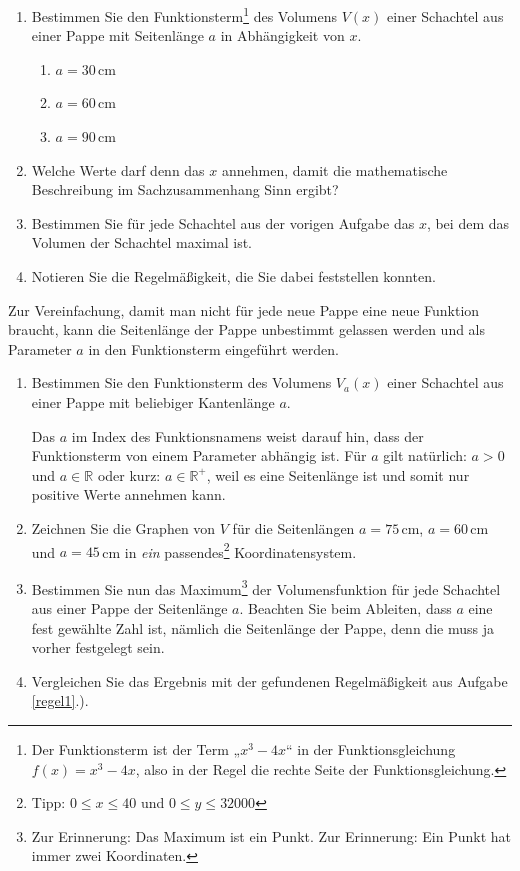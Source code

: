 \documentclass[11pt,a4paper,twoside,fleqn]{article}
\begin{document}
\begin{question}%
  \begin{enumerate}
  \item Bestimmen Sie den Funktionsterm\footnote{Der Funktionsterm ist
    der Term „$x^3-4x$“ in der Funktionsgleichung $f(x)=x^3-4x$, also
    in der Regel die rechte Seite der Funktionsgleichung.} des Volumens $V(x)$ einer Schachtel aus
    einer Pappe mit Seitenlänge $a$ in Abhängigkeit von $x$.
    \begin{multicols}{3}
      \begin{enumerate}
      \item $a=30\,$cm
      \item $a=60\,$cm
      \item $a=90\,$cm
      \end{enumerate}
    \end{multicols}
  \item Welche Werte darf denn das $x$ annehmen, damit die
    mathematische Beschreibung im Sachzusammenhang Sinn ergibt?
  \item Bestimmen Sie für jede Schachtel aus der vorigen Aufgabe das
    $x$, bei dem das Volumen der Schachtel maximal ist.
  \item \label{regel1}Notieren Sie die Regelmäßigkeit, die Sie dabei feststellen konnten.
  \end{enumerate}

  Zur Vereinfachung, damit man nicht für jede neue Pappe eine neue
  Funktion braucht, kann die Seitenlänge der Pappe unbestimmt gelassen 
  werden und als Parameter $a$ in den Funktionsterm eingeführt werden.
  \begin{enumerate}[resume]
  \item Bestimmen Sie den Funktionsterm des Volumens $V_a(x)$ einer
    Schachtel aus einer Pappe mit beliebiger Kantenlänge $a$.

    Das $a$
    im Index des Funktionsnamens weist darauf hin, dass der
    Funktionsterm von einem Parameter abhängig ist. Für $a$ gilt
    natürlich: $a > 0 $ und $a \in\mathbb{R}$ oder kurz:
    $a\in\mathbb{R}^+$, weil es eine Seitenlänge ist und somit nur
    positive Werte annehmen kann.
  \item Zeichnen Sie die Graphen von $V$ für die Seitenlängen
    $a=75\,$cm, $a=60\,$cm und $a=45\,$cm in \emph{ein}
    passendes\footnote{Tipp: $0 \leq x \leq 40$ und $0 \leq y \leq 32000$}
    Koordinatensystem. 
  \item Bestimmen Sie nun das Maximum\footnote{Zur Erinnerung: Das
      Maximum ist ein Punkt. Zur Erinnerung: Ein Punkt hat immer zwei
      Koordinaten.} der Volumensfunktion für jede 
    Schachtel aus einer Pappe der Seitenlänge $a$. Beachten Sie beim
    Ableiten, dass $a$ eine fest gewählte Zahl 
    ist, nämlich die Seitenlänge der Pappe, denn die muss ja vorher
    festgelegt sein.
  \item Vergleichen Sie das Ergebnis mit der gefundenen Regelmäßigkeit
    aus Aufgabe \ref{regel1}.).
  \end{enumerate}
\end{question}
\end{document}
